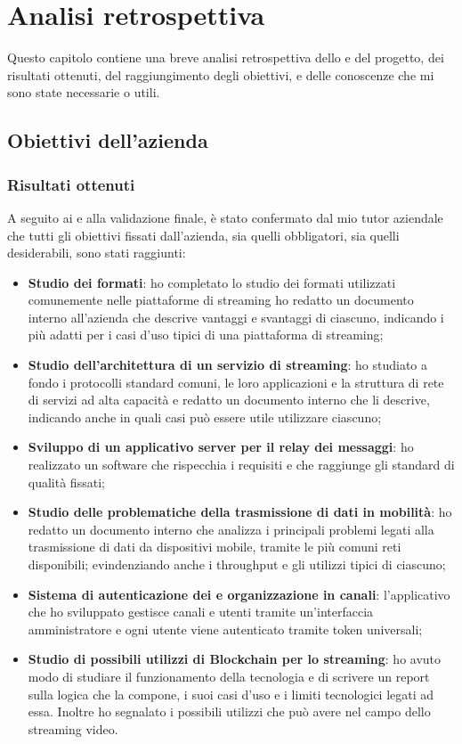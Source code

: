 \chapter{Analisi retrospettiva}
Questo capitolo contiene una breve analisi retrospettiva dello  e del progetto, dei risultati ottenuti, del raggiungimento degli obiettivi, e delle conoscenze che mi sono state necessarie o utili.

\section{Obiettivi dell'azienda}

\subsection{Risultati ottenuti}
A seguito ai  e alla validazione finale, è stato confermato dal mio tutor aziendale che tutti gli obiettivi fissati dall'azienda, sia quelli obbligatori, sia quelli desiderabili, sono stati raggiunti:
\begin{itemize}
   \item \textbf{Studio dei formati}: ho completato lo studio dei formati utilizzati comunemente nelle piattaforme di streaming ho redatto un documento interno all'azienda che descrive vantaggi e svantaggi di ciascuno, indicando i più adatti per i casi d'uso tipici di una piattaforma di streaming;
   \item \textbf{Studio dell'architettura di un servizio di streaming}: ho studiato a fondo i protocolli standard comuni, le loro applicazioni e la struttura di rete di servizi ad alta capacità e redatto un documento interno che li descrive, indicando anche in quali casi può essere utile utilizzare ciascuno;
   \item \textbf{Sviluppo di un applicativo server per il relay dei messaggi}: ho realizzato un software che rispecchia i requisiti e che raggiunge gli standard di qualità fissati;
   \item \textbf{Studio delle problematiche della trasmissione di dati in mobilità}: ho redatto un documento interno che analizza i principali problemi legati alla trasmissione di dati da dispositivi mobile, tramite le più comuni reti disponibili; evindenziando anche i throughput e gli utilizzi tipici di ciascuno;
   \item \textbf{Sistema di autenticazione dei  e organizzazione in canali}: l'applicativo che ho sviluppato gestisce canali e utenti tramite un'interfaccia amministratore e ogni utente viene autenticato tramite token universali;
   \item \textbf{Studio di possibili utilizzi di Blockchain per lo streaming}: ho avuto modo di studiare il funzionamento della tecnologia e di scrivere un report sulla logica che la compone, i suoi casi d'uso e i limiti tecnologici legati ad essa. Inoltre ho segnalato i possibili utilizzi che può avere nel campo dello streaming video.
\end{itemize}
